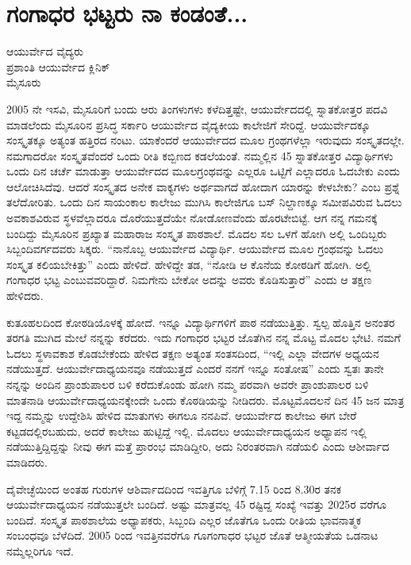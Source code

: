 {\fontsize{14}{16}\selectfont
\chapter{ಗಂಗಾಧರ ಭಟ್ಟರು ನಾ ಕಂಡಂತೆ...}

\begin{center}
\smallskip
ಆಯುರ್ವೇದ ವೈದ್ಯರು\\
ಪ್ರಶಾಂತಿ ಆಯುರ್ವೇದ ಕ್ಲಿನಿಕ್\\
ಮೈಸೂರು
\addrule
\end{center}
2005 ನೇ ಇಸವಿ, ಮೈಸೂರಿಗೆ ಬಂದು ಆರು ತಿಂಗಳುಗಳು ಕಳೆದಿತ್ತಷ್ಟೇ, ಆಯುರ್ವೇದದಲ್ಲಿ ಸ್ನಾತಕೋತ್ತರ ಪದವಿ ಮಾಡಲೆಂದು ಮೈಸೂರಿನ ಪ್ರಸಿದ್ಧ ಸರ್ಕಾರಿ ಆಯುರ್ವೇದ ವೈದ್ಯಕೀಯ ಕಾಲೇಜಿಗೆ ಸೇರಿದ್ದೆ. ಆಯುರ್ವೇದಕ್ಕೂ ಸಂಸ್ಕೃತಕ್ಕೂ ಅತ್ಯಂತ ಹತ್ತಿರದ ನಂಟು. ಯಾಕೆಂದರೆ ಆಯುರ್ವೇದದ ಮೂಲ ಗ್ರಂಥಗಳೆಲ್ಲಾ ಇರುವುದು ಸಂಸ್ಕೃತದಲ್ಲೇ. ನಮಗಾದರೋ ಸಂಸ್ಕೃತವೆಂದರೆ ಒಂದು ರೀತಿ ಕಬ್ಬಿಣದ ಕಡಲೆಯಂತೆ. ನಮ್ಮಲ್ಲಿನ 4\enginline{--}5 ಸ್ನಾತಕೋತ್ತರ ವಿದ್ಯಾರ್ಥಿಗಳು ಒಂದು ದಿನ ಚರ್ಚೆ ಮಾಡುತ್ತಾ ಆಯುರ್ವೇದದ ಮೂಲಗ್ರಂಥವನ್ನು ಎಲ್ಲರೂ ಒಟ್ಟಿಗೆ ಎಲ್ಲಾದರೂ ಓದಬೇಕು ಎಂದು ಆಲೋಚಿಸಿದೆವು. ಆದರೆ ಸಂಸ್ಕೃತದ ಅನೇಕ ವಾಕ್ಯಗಳು ಅರ್ಥವಾಗದೆ ಹೋದಾಗ ಯಾರನ್ನು ಕೇಳಬೇಕು? ಎಂಬ ಪ್ರಶ್ನೆ ತಲೆದೋರಿತು. ಒಂದು ದಿನ ಸಾಯಂಕಾಲ ಕಾಲೇಜು ಮುಗಿಸಿ ಕಾಲೇಜಿಗೂ ಬಸ್ ನಿಲ್ದಾಣಕ್ಕೂ ಸಮೀಪವಿರುವ ಓದಲು ಅವಕಾಶವಿರುವ ಸ್ಥಳವೆಲ್ಲಾದರೂ ದೊರೆಯುತ್ತದೆಯೇ ನೋಡೋಣವೆಂದು ಹೊರಟೇಬಿಟ್ಟೆ. ಆಗ ನನ್ನ ಗಮನಕ್ಕೆ ಬಂದಿದ್ದು ಮೈಸೂರಿನ ಪ್ರಖ್ಯಾತ ಮಹಾರಾಜ ಸಂಸ್ಕೃತ ಪಾಠಶಾಲೆ. ಮೊದಲ ಸಲ ಒಳಗೆ ಹೋಗಿ ಅಲ್ಲಿ ಒಂದಿಬ್ಬರು ಸಿಬ್ಬಂದಿವರ್ಗದವರು ಸಿಕ್ಕರು. “ನಾನೊಬ್ಬ ಆಯುರ್ವೇದ ವಿದ್ಯಾರ್ಥಿ. ಆಯುರ್ವೇದ ಮೂಲ ಗ್ರಂಥವನ್ನು ಓದಲು ಸಂಸ್ಕೃತ ಕಲಿಯಬೇಕಿತ್ತು” ಎಂದು ಹೇಳಿದೆ. ಹೇಳಿದ್ದೇ ತಡ,  “ನೋಡಿ ಆ ಕೊನೆಯ ಕೋಠಡಿಗೆ ಹೋಗಿ. ಅಲ್ಲಿ ಗಂಗಾಧರ ಭಟ್ಟ ಎಂಬುವವರಿದ್ದಾರೆ. ನಿಮಗೇನು ಬೇಕೋ ಅದನ್ನು ಅವರು ಕೊಡಿಸುತ್ತಾರೆ” ಎಂದು ಆ ತಕ್ಷಣ ಹೇಳಿದರು.

ಕುತೂಹಲದಿಂದ ಕೋಠಡಿಯೊಳಕ್ಕೆ ಹೋದೆ. ಇನ್ನೂ ವಿದ್ಯಾರ್ಥಿಗಳಿಗೆ ಪಾಠ ನಡೆಯುತ್ತಿತ್ತು. ಸ್ವಲ್ಪ ಹೊತ್ತಿನ  ಅನಂತರ ತರಗತಿ ಮುಗಿದ ಮೇಲೆ ನನ್ನನ್ನು ಕರೆದರು. ಇದು ಗಂಗಾಧರ ಭಟ್ಟರ ಜೊತೆಗಿನ ನನ್ನ ಮೊಟ್ಟ ಮೊದಲ ಭೇಟಿ. ನಮಗೆ ಓದಲು  ಸ್ಥಳಾವಕಾಶ ಕೊಡಬೇಕೆಂದು ಹೇಳಿದ ತಕ್ಷಣ ಅತ್ಯಂತ ಸಂತಸದಿಂದ, “ಇಲ್ಲಿ ಎಲ್ಲಾ ವೇದಗಳ ಅಧ್ಯಯನ ನಡೆಯುತ್ತದೆ. ಆಯುರ್ವೇದಾಧ್ಯಯನವೂ ನಡೆಯುತ್ತದೆ ಎಂದರೆ ನನಗೆ ಇನ್ನೂ ಸಂತೋಷ” ಎಂದು ಸ್ವತಃ ತಾನೇ ನನ್ನನ್ನು ಅಂದಿನ ಪ್ರಾಂಶುಪಾಲರ ಬಳಿ ಕರೆದುಕೊಂಡು ಹೋಗಿ ನಮ್ಮ ಪರವಾಗಿ ಅವರೇ ಪ್ರಾಂಶುಪಾಲರ ಬಳಿ ಮಾತನಾಡಿ ಆಯುರ್ವೇದಾಧ್ಯಯನಕ್ಕೇಂದೇ ಒಂದು ಕೊಠಡಿಯನ್ನು ನೀಡಿದರು. 
ಮೊಟ್ಟಮೊದಲನೆ ದಿನ 4\enginline{--}5 ಜನ ಮಾತ್ರ ಇದ್ದ ನಮ್ಮನ್ನು ಉದ್ದೇಶಿಸಿ ಹೇಳಿದ ಮಾತುಗಳು ಈಗಲೂ ನನಪಿವೆ. ಆಯುರ್ವೇದ ಕಾಲೇಜು ಈಗ ಬೇರೆ ಕಟ್ಟಡದಲ್ಲಿರಬಹುದು, ಅದರೆ ಕಾಲೇಜು ಹುಟ್ಟಿದ್ದೆ ಇಲ್ಲಿ. ಮೊದಲು ಆಯುರ್ವೇದಾಧ್ಯಯನ ಅಧ್ಯಾಪನ ಇಲ್ಲಿ ನಡೆಯುತ್ತಿದ್ದಿದ್ದನ್ನು ನೀವು ಈಗ ಮತ್ತೆ ಪ್ರಾರಂಭ ಮಾಡಿದ್ದೀರಿ, ಅದು ನಿರಂತರವಾಗಿ ನಡೆಯಲಿ ಎಂದು ಆಶೀರ್ವಾದ ಮಾಡಿದರು. 


ದೈವೇಚ್ಛೆಯಿಂದ ಅಂತಹ ಗುರುಗಳ ಆಶಿರ್ವಾದದಿಂದ ಇವತ್ತಿಗೂ ಬೆಳಿಗ್ಗೆ 7.15 ರಿಂದ 8.30ರ ತನಕ ಆಯುರ್ವೇದಾಧ್ಯಯನ ನಡೆಯುತ್ತಲೇ ಬಂದಿದೆ. ಅಷ್ಟು ಮಾತ್ರವಲ್ಲ 4\enginline{--}5 ರಷ್ಟಿದ್ದ ಸಂಖ್ಯೆ ಇವತ್ತು 20\enginline{--}25ರ ವರೆಗೂ ಬಂದಿದೆ. ಸಂಸ್ಕೃತ ಪಾಠಶಾಲೆಯ ಅಧ್ಯಾಪಕರು, ಸಿಬ್ಬಂದಿ ಎಲ್ಲರ ಜೊತೆಗೂ ಒಂದು ರೀತಿಯ ಭಾವನಾತ್ಮಕ ಸಂಬಂಧವೂ ಬೆಳೆದಿದೆ. 2005 ರಿಂದ ಇವತ್ತಿನವರೆಗೂ ಗೂಗಂಗಾಧರ ಭಟ್ಟರ ಜೊತೆ ಆತ್ಮೀಯತೆಯ ಒಡನಾಟ ನಮ್ಮೆಲ್ಲರಿಗೂ ಇದೆ.

}
